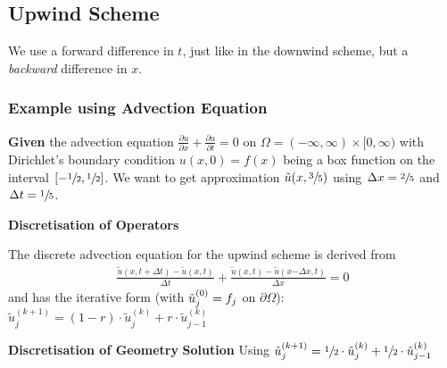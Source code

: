 \subsection{Upwind Scheme}
We use a forward difference in $t$, just like in the downwind scheme,
but a \emph{backward} difference in $x$.

\subsubsection{Example using Advection Equation}
\textbf{Given} the advection equation 
$\frac{\partial u}{\partial x} + \frac{\partial u}{\partial t} = 0$ on
$\Omega = (-\infty,\infty)\times[0,\infty)$ with Dirichlet's boundary condition
$u(x,0) = f(x)$ being a box function on the interval $[-\sfrac{1}{2},\sfrac{1}{2}]$.
We want to get approximation $\tilde{u}(x,\sfrac{3}{5})$ using
$\Delta x = \sfrac{2}{5}$ and $\Delta t = \sfrac{1}{5}$.

\textbf{Discretisation of Operators}

The discrete advection equation for the upwind scheme is derived from
\begin{align*}
	\frac{\tilde{u}(x,t+\Delta t)-\tilde{u}(x,t)}{\Delta t}+\frac{\tilde{u}(x,t)-\tilde{u}(x\mathbf{-}\Delta x,t)}{\Delta x}=0
\end{align*}
and has the iterative form (with $\tilde{u}_j^{(0)}=f_j$ on $\partial\Omega$):
\colorbox{shadecolor}{$
	\displaystyle\tilde{u}_{j}^{(k+1)}=(1-r)\cdot\tilde{u}_{j}^{(k)}+r\cdot\tilde{u}_{j-1}^{(k)}
$}

\textbf{Discretisation of Geometry}
\textbf{Solution}
Using $\tilde{u}_j^{(k+1)} = \sfrac{1}{2}\cdot\tilde{u}_j^{(k)} + \sfrac{1}{2}\cdot\tilde{u}_{j-1}^{(k)}$